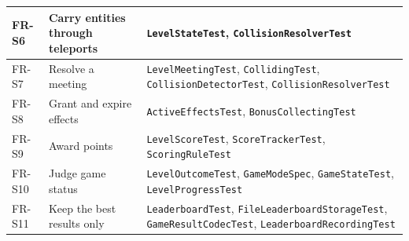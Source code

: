 \begin{center}
\begin{tabular}{|p{1.6cm}|p{4.4cm}|p{6.4cm}|}
    \hline
    FR-S6 & Carry entities through teleports & \texttt{LevelStateTest}, \texttt{CollisionResolverTest} \\
    \hline
    FR-S7 & Resolve a meeting & \texttt{LevelMeetingTest}, \texttt{CollidingTest}, \texttt{CollisionDetectorTest},
    \texttt{CollisionResolverTest} \\
    \hline
    FR-S8 & Grant and expire effects & \texttt{ActiveEffectsTest}, \texttt{BonusCollectingTest} \\
    \hline
    FR-S9 & Award points & \texttt{LevelScoreTest}, \texttt{ScoreTrackerTest}, \texttt{ScoringRuleTest} \\
    \hline
    FR-S10 & Judge game status & \texttt{LevelOutcomeTest}, \texttt{GameModeSpec}, \texttt{GameStateTest},
    \texttt{LevelProgressTest} \\
    \hline
    FR-S11 & Keep the best results only & \texttt{LeaderboardTest}, \texttt{FileLeaderboardStorageTest},
    \texttt{GameResultCodecTest}, \texttt{LeaderboardRecordingTest} \\
    \hline
  \end{tabular}
\end{center}
